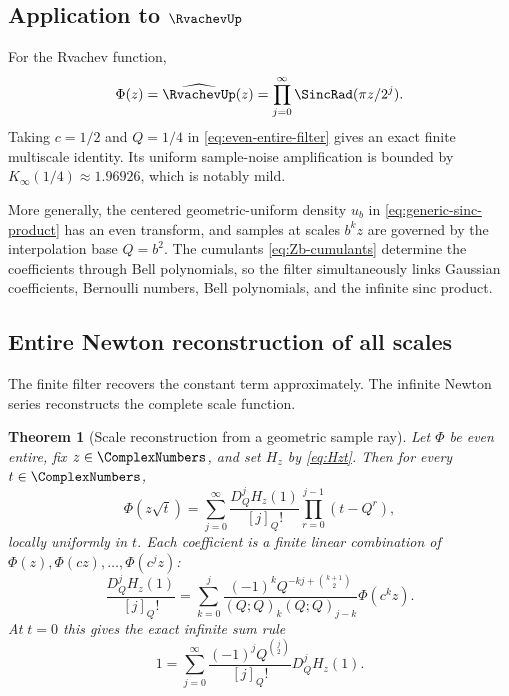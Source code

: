 \documentclass[11pt,oneside]{article}
\numberwithin{equation}{section}
\newtheorem{theorem}{Theorem}[section]
\theoremstyle{definition}
\theoremstyle{remark}
\begin{document}
\subsection{Application to $\RvachevUp$}

For the Rvachev function,
\[
 \Phi(z)=\widehat\RvachevUp(z)
 =\prod_{j=0}^{\infty}\SincRad(\pi z/2^j).
\]
Taking $c=1/2$ and $Q=1/4$ in
\eqref{eq:even-entire-filter} gives an exact finite multiscale identity.  Its
uniform sample-noise amplification is bounded by
$K_\infty(1/4)\approx1.96926$, which is notably mild.

More generally, the centered geometric-uniform density $u_b$ in
\eqref{eq:generic-sinc-product} has an even transform, and samples at scales
$b^kz$ are governed by the interpolation base $Q=b^2$.  The cumulants
\eqref{eq:Zb-cumulants} determine the coefficients through Bell polynomials,
so the filter simultaneously links Gaussian coefficients, Bernoulli numbers,
Bell polynomials, and the infinite sinc product.

\subsection{Entire Newton reconstruction of all scales}

The finite filter recovers the constant term approximately.  The infinite
Newton series reconstructs the complete scale function.

\begin{theorem}[Scale reconstruction from a geometric sample ray]
Let $\Phi$ be even entire, fix $z\in\ComplexNumbers$, and set $H_z$ by
\eqref{eq:Hzt}.  Then for every $t\in\ComplexNumbers$,
\begin{equation}
 \Phi(z\sqrt t)
 =\sum_{j=0}^{\infty}
 \frac{D_Q^jH_z(1)}{[j]_Q!}
 \prod_{r=0}^{j-1}(t-Q^r),
 \label{eq:Phi-scale-Newton}
\end{equation}
locally uniformly in $t$.  Each coefficient is a finite linear combination of
$\Phi(z),\Phi(cz),\ldots,\Phi(c^jz)$:
\begin{equation}
 \frac{D_Q^jH_z(1)}{[j]_Q!}
 =\sum_{k=0}^j
 \frac{(-1)^kQ^{-kj+\binom{k+1}{2}}}
 {(Q;Q)_k(Q;Q)_{j-k}}\Phi(c^kz).
 \label{eq:Phi-scale-coeff}
\end{equation}
At $t=0$ this gives the exact infinite sum rule
\begin{equation}
 1=\sum_{j=0}^{\infty}
 \frac{(-1)^jQ^{\binom j2}}{[j]_Q!}D_Q^jH_z(1).
 \label{eq:Phi-scale-origin}
\end{equation}
\end{theorem}
\end{document}
